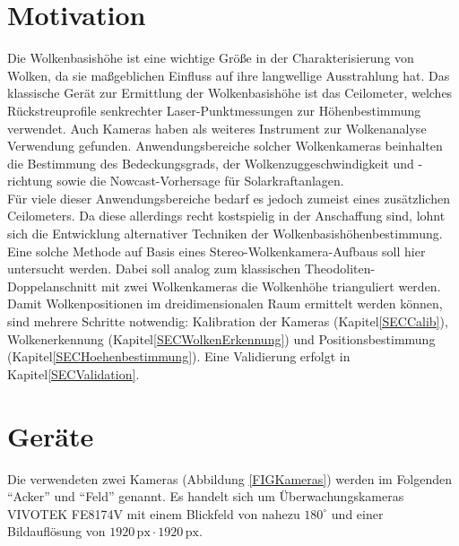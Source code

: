 \documentclass[a4paper,11pt,twoside,german]{article}
\newcommand{\absatz}{\smallbreak}
\begin{document}
\listoffigures %

\newpage


\section{Motivation}
Die Wolkenbasishöhe ist eine wichtige Größe in der Charakterisierung von Wolken,
da sie maßgeblichen Einfluss auf ihre langwellige Ausstrahlung hat.  Das
klassische Gerät zur Ermittlung der Wolkenbasishöhe ist das Ceilometer, welches
Rückstreuprofile senkrechter Laser-Punktmessungen zur Höhenbestimmung verwendet.
Auch Kameras haben als weiteres Instrument zur Wolkenanalyse Verwendung
gefunden. Anwendungsbereiche solcher Wolkenkameras beinhalten die Bestimmung des
Bedeckungsgrads, der Wolkenzuggeschwindigkeit und -richtung sowie die
Nowcast-Vorhersage für Solarkraftanlagen.\\ Für viele dieser Anwendungsbereiche
bedarf es jedoch zumeist eines zusätzlichen Ceilometers. Da diese allerdings
recht kostspielig in der Anschaffung sind, lohnt sich die Entwicklung
alternativer Techniken der Wolkenbasishöhenbestimmung. Eine solche Methode auf
Basis eines Stereo-Wolkenkamera-Aufbaus soll hier untersucht werden. Dabei soll
analog zum klassischen Theodoliten-Doppelanschnitt mit zwei Wolkenkameras die
Wolkenhöhe trianguliert werden.\\ Damit Wolkenpositionen im
dreidimensionalen Raum ermittelt werden können, sind mehrere Schritte notwendig:
Kalibration der Kameras (Kapitel\;\ref{SECCalib}), Wolkenerkennung
(Kapitel\;\ref{SECWolkenErkennung}) und Positionsbestimmung
(Kapitel\;\ref{SECHoehenbestimmung}). Eine Validierung erfolgt in
Kapitel\;\ref{SECValidation}.


\section{Geräte}
\label{SECGeraete}

Die verwendeten zwei Kameras (Abbildung \ref{FIGKameras}) werden im Folgenden
\enquote{Acker} und \enquote{Feld} genannt. Es handelt sich um
Überwachungskameras VIVOTEK FE8174V mit einem Blickfeld von nahezu $180^\circ$
und einer Bildauflösung von $1920\,\mathrm{px} \cdot 1920
\,\mathrm{px}$.
\absatz
\end{document}
